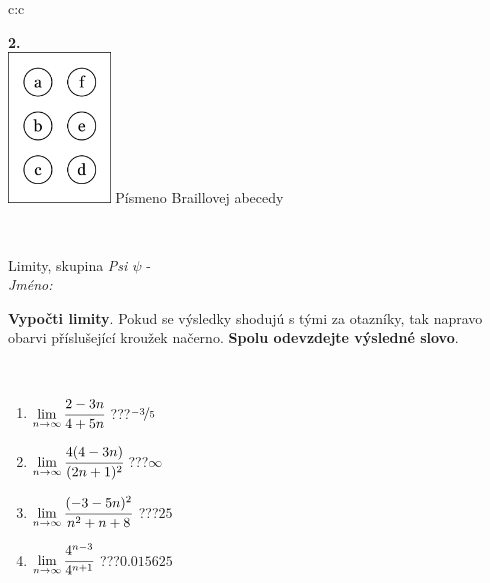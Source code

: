 \documentclass[10pt]{report}
\begin{document}
\begin{tabular}{c:c}
\begin{minipage}[c][104.5mm][t]{0.5\linewidth}
\begin{center}
\begin{minipage}{0.20\linewidth}
\begin{center}
{\Huge\bfseries 2.} \\[2mm]
\includegraphics[height=40mm]{../images/braille.png}
{\small Písmeno Braillovej abecedy}
\end{center}
\end{minipage}
\end{center}
\end{minipage}
\\ \hdashline
\begin{minipage}[c][104.5mm][t]{0.5\linewidth}
\begin{center}
\vspace{7mm}
{\huge Limity, skupina \textit{Psi $\psi$} -}\\[5mm]
\textit{Jméno:}\phantom{xxxxxxxxxxxxxxxxxxxxxxxxxxxxxxxxxxxxxxxxxxxxxxxxxxxxxxxxxxxxxxxxx}\\[5mm]
\begin{minipage}{0.95\linewidth}
\begin{center}
\textbf{Vypočti limity}. Pokud se výsledky shodujú s tými za otazníky, tak napravo\\obarvi příslušející kroužek načerno. \textbf{Spolu odevzdejte výsledné slovo}.
\end{center}
\end{minipage}
\\[1mm]
\begin{minipage}{0.79\linewidth}
\begin{center}
\begin{varwidth}{\linewidth}
\begin{enumerate}
\normalsize
\item $\lim\limits_{n\to\infty}\cfrac{2-3n}{4+5n}$\quad \dotfill\; ???\;\dotfill \quad $\nicefrac{-3}{5}$
\item $\lim\limits_{n\to\infty}\cfrac{4(4-3n)}{(2n+1)^2}$\quad \dotfill\; ???\;\dotfill \quad $\infty$
\item $\lim\limits_{n\to\infty}\cfrac{(-3-5n)^2}{n^2+n+8}$\quad \dotfill\; ???\;\dotfill \quad $25$
\item $\lim\limits_{n\to\infty}\cfrac{4^{n-3}}{4^{n+1}}$\quad \dotfill\; ???\;\dotfill \quad $0.015625$

\end{enumerate}
\end{varwidth}
\end{center}
\end{minipage}
\end{center}
\end{minipage}
\end{tabular}
\end{document}
